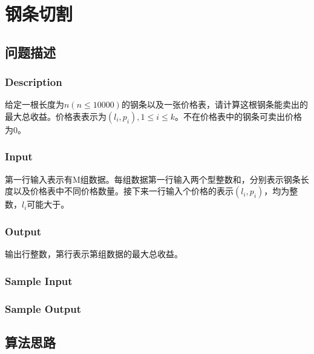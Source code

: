 \section{钢条切割}
\subsection{问题描述}
\subsubsection*{Description}

给定一根长度为$n(n\leq10000)$的钢条以及一张价格表，请计算这根钢条能卖出的最大总收益。价格表表示为$(l_i,p_i), 1\leq i\leq k$。不在价格表中的钢条可卖出价格为$0$。

\subsubsection*{Input}

第一行输入表示有M组数据。每组数据第一行输入两个型整数和，分别表示钢条长度以及价格表中不同价格数量。接下来一行输入个价格的表示$(l_i,p_i)$，均为整数，$l_i$可能大于。

\subsubsection*{Output}

输出行整数，第行表示第组数据的最大总收益。

\subsubsection*{Sample Input}






\subsubsection*{Sample Output}



\subsection{算法思路}

